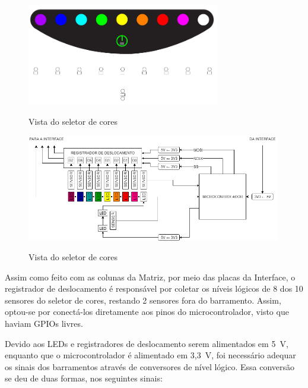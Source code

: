 \begin{figure}[H]
    \centering
    \caption{Vista do seletor de cores}
    \includegraphics[width=0.75\textwidth]{./dados/figuras/seletor-cores}
    \label{fig:seletor-cores}
\end{figure}

\begin{figure}[H]
    \centering
    \caption{Vista do seletor de cores}
    \includegraphics[width=0.99\textwidth]{./dados/figuras/diagrama-seletor-cores}
    \label{fig:diagrama-seletor-cores}
\end{figure}

Assim como feito com as colunas da Matriz, por meio das placas da Interface, o registrador de deslocamento é responsável por coletar os níveis lógicos de 8 dos 10 sensores do seletor de cores, restando 2 sensores fora do barramento. Assim, optou-se por conectá-los diretamente aos pinos do microcontrolador, visto que haviam GPIOs livres.

Devido aos LEDs e registradores de deslocamento serem alimentados em {5\ V}, enquanto que o microcontrolador é alimentado em {3,3\ V}, foi necessário adequar os sinais dos barramentos através de conversores de nível lógico. Essa conversão se deu de duas formas, nos seguintes sinais:

